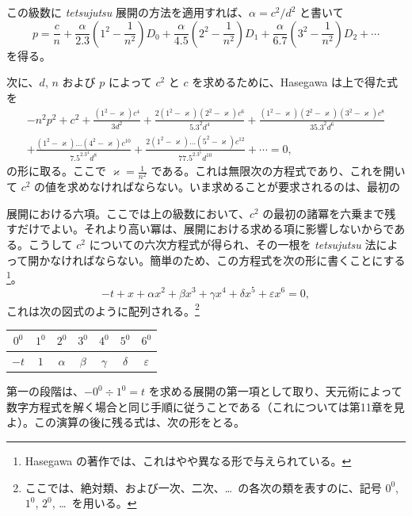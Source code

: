 \documentclass[11pt]{article}
\newcommand{\scanpage}[2]{\clearpage\setcounter{footnote}{0}\noindent{\footnotesize\color{gray}PDF #1 頁 · #2}\par\medskip}
\begin{document}
この級数に \emph{tetsujutsu} 展開の方法を適用すれば、$\alpha=c^2/d^2$ と書いて
\[
p=\frac{c}{n}+\frac{\alpha}{2.3}\left(1^2-\frac{1}{n^2}\right)D_0+\frac{\alpha}{4.5}\left(2^2-\frac{1}{n^2}\right)D_1+\frac{\alpha}{6.7}\left(3^2-\frac{1}{n^2}\right)D_2+\cdots
\]
を得る。

次に、$d$, $n$ および $p$ によって $c^2$ と $c$ を求めるために、Hasegawa は上で得た式を
\begin{multline*}
-n^2p^2+c^2+\frac{(1^2-\varkappa)c^4}{3d^2}+\frac{2(1^2-\varkappa)(2^2-\varkappa)c^6}{5.3^2d^4}+\frac{(1^2-\varkappa)(2^2-\varkappa)(3^2-\varkappa)c^8}{35.3^2d^6}\\
+\frac{(1^2-\varkappa)\ldots(4^2-\varkappa)c^{10}}{7.5^2.3^4d^8}+\frac{2(1^2-\varkappa)\ldots(5^2-\varkappa)c^{12}}{77.5^2.3^5d^{10}}+\cdots=0,
\end{multline*}
の形に取る。ここで $\varkappa=\frac{1}{n^2}$ である。これは無限次の方程式であり、これを開いて $c^2$ の値を求めなければならない。いま求めることが要求されるのは、最初の

\scanpage{0295}{印刷頁 281}
\noindent 展開における六項。ここでは上の級数において、$c^2$ の最初の諸冪を六乗まで残すだけでよい。それより高い冪は、展開における求める項に影響しないからである。こうして $c^2$ についての六次方程式が得られ、その一根を \emph{tetsujutsu} 法によって開かなければならない。簡単のため、この方程式を次の形に書くことにする\footnote{Hasegawa の著作では、これはやや異なる形で与えられている。}。
\[
-t+x+\alpha x^2+\beta x^3+\gamma x^4+\delta x^5+\varepsilon x^6=0,
\]
これは次の図式のように配列される。\footnote{ここでは、絶対類、および一次、二次、\dots\ の各次の類を表すのに、記号 $0^0$, $1^0$, $2^0$, \dots\ を用いる。}

\begin{center}
\begin{tabular}{|c|c|c|c|c|c|c|}
\hline
$0^0$ & $1^0$ & $2^0$ & $3^0$ & $4^0$ & $5^0$ & $6^0$ \\
\hline
$-t$ & $1$ & $\alpha$ & $\beta$ & $\gamma$ & $\delta$ & $\varepsilon$ \\
\hline
\end{tabular}
\end{center}

第一の段階は、$-0^0\div 1^0=t$ を求める展開の第一項として取り、天元術によって数字方程式を解く場合と同じ手順に従うことである（これについては第11章を見よ）。この演算の後に残る式は、次の形をとる。
\end{document}
